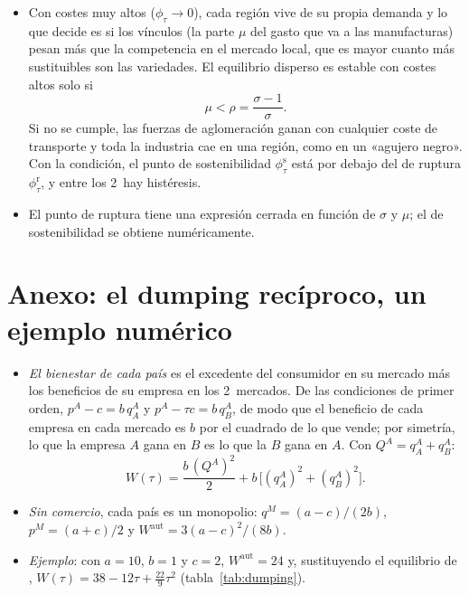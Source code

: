 \documentclass[11pt]{article}
\begin{document}
\begin{itemize}
\item Con costes muy altos ($\phi_\tau\to0$), cada región vive de su propia demanda y lo que decide es si los vínculos (la parte $\mu$ del gasto que va a las manufacturas) pesan más que la competencia en el mercado local, que es mayor cuanto más sustituibles son las variedades. El equilibrio disperso es estable con costes altos solo si
  $$\mu<\rho=\frac{\sigma-1}{\sigma}.$$
  Si no se cumple, las fuerzas de aglomeración ganan con cualquier coste de transporte y toda la industria cae en una región, como en un «agujero negro»\nocite{FujitaKrugmanVenables1999Spatial}. Con la condición, el punto de sostenibilidad $\phi_\tau^{\mathrm s}$ está por debajo del de ruptura $\phi_\tau^{\mathrm r}$, y entre los 2~hay histéresis.
\item El punto de ruptura tiene una expresión cerrada en función de $\sigma$ y $\mu$; el de sostenibilidad se obtiene numéricamente\nocite{BaldwinEtAl2003Economic}.
\end{itemize}

\section{Anexo: el dumping recíproco, un ejemplo numérico}\label{anexo:dumping}

\begin{itemize}
\item \emph{El bienestar de cada país} es el excedente del consumidor en su mercado más los beneficios de su empresa en los 2~mercados. De las condiciones de primer orden, $p^A-c=b\,q_A^A$ y $p^A-\tau c=b\,q_B^A$, de modo que el beneficio de cada empresa en cada mercado es $b$ por el cuadrado de lo que vende; por simetría, lo que la empresa $A$ gana en $B$ es lo que la $B$ gana en $A$. Con $Q^A=q_A^A+q_B^A$:
  $$W(\tau)=\frac{b\,(Q^A)^2}{2}+b\,\Big[(q_A^A)^2+(q_B^A)^2\Big].$$
\item \emph{Sin comercio}, cada país es un monopolio: $q^M=(a-c)/(2b)$, $p^M=(a+c)/2$ y $W^{\mathrm{aut}}=3(a-c)^2/(8b)$.
\item \emph{Ejemplo}: con $a=10$, $b=1$ y $c=2$, $W^{\mathrm{aut}}=24$ y, sustituyendo el equilibrio de , $W(\tau)=38-12\tau+\frac{22}{9}\tau^2$ (tabla~\ref{tab:dumping}).
\end{itemize}
\end{document}
